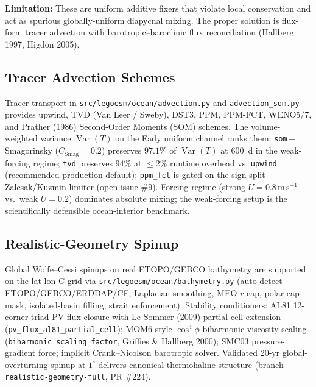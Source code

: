 \documentclass[11pt,a4paper]{article}
\DeclareMathOperator{\Var}{Var}
\begin{document}
\textbf{Limitation:} These are uniform additive fixers that violate local conservation and act as spurious globally-uniform diapycnal mixing.  The proper solution is flux-form tracer advection with barotropic--baroclinic flux reconciliation (Hallberg 1997, Higdon 2005).

\subsection{Tracer Advection Schemes}

Tracer transport in \texttt{src/legoesm/ocean/advection.py} and
\texttt{advection\_som.py} provides upwind, TVD (Van Leer / Sweby),
DST3, PPM, PPM-FCT, WENO5/7, and Prather (1986) Second-Order Moments
(SOM) schemes.  The volume-weighted variance $\Var(T)$ on the Eady
uniform channel ranks them: \texttt{som}\,+\,Smagorinsky
($C_{\mathrm{Smag}}{=}0.2$) preserves $97.1\%$ of $\Var(T)$ at
600~d in the weak-forcing regime; \texttt{tvd} preserves $94\%$ at
$\le 2\%$ runtime overhead vs. \texttt{upwind} (recommended
production default); \texttt{ppm\_fct} is gated on the sign-split
Zalesak/Kuzmin limiter (open issue \#9).  Forcing regime (strong
$U{=}0.8\,\mathrm{m\,s^{-1}}$ vs.\ weak $U{=}0.2$) dominates absolute
mixing; the weak-forcing setup is the scientifically defensible
ocean-interior benchmark.

\subsection{Realistic-Geometry Spinup}

Global Wolfe--Cessi spinups on real ETOPO/GEBCO bathymetry are
supported on the lat-lon C-grid via \texttt{src/legoesm/ocean/bathymetry.py}
(auto-detect ETOPO/GEBCO/ERDDAP/CF, Laplacian smoothing, MEO
$r$-cap, polar-cap mask, isolated-basin filling, strait
enforcement).  Stability conditioners: AL81 12-corner-triad
PV-flux closure with Le Sommer (2009) partial-cell extension
(\texttt{pv\_flux\_al81\_partial\_cell}); MOM6-style $\cos^4\phi$
biharmonic-viscosity scaling (\texttt{biharmonic\_scaling\_factor},
Griffies \& Hallberg 2000); SMC03 pressure-gradient force; implicit
Crank--Nicolson barotropic solver.  Validated 20-yr global-overturning
spinup at $1^\circ$ delivers canonical thermohaline structure
(branch \texttt{realistic-geometry-full}, PR \#224).
\end{document}
